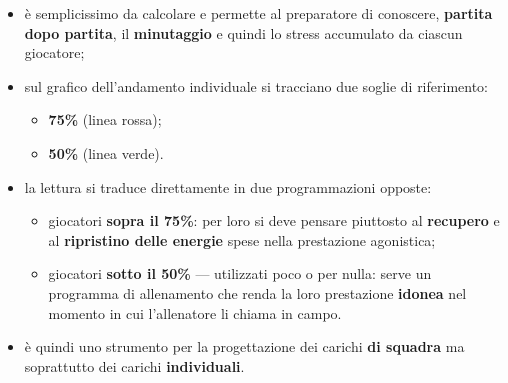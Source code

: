 \begin{itemize}
  \item è semplicissimo da calcolare e permette al preparatore di conoscere, \textbf{partita dopo
    partita}, il \textbf{minutaggio} e quindi lo stress accumulato da ciascun giocatore;
  \item sul grafico dell'andamento individuale si tracciano due soglie di riferimento:
    \begin{itemize}
      \item \textbf{75\%} (linea rossa);
      \item \textbf{50\%} (linea verde).
    \end{itemize}
  \item la lettura si traduce direttamente in due programmazioni opposte:
    \begin{itemize}
      \item giocatori \textbf{sopra il 75\%}: per loro si deve pensare piuttosto al
        \textbf{recupero} e al \textbf{ripristino delle energie} spese nella prestazione agonistica;
      \item giocatori \textbf{sotto il 50\%} --- utilizzati poco o per nulla: serve un programma di
        allenamento che renda la loro prestazione \textbf{idonea} nel momento in cui l'allenatore
        li chiama in campo.
    \end{itemize}
  \item è quindi uno strumento per la progettazione dei carichi \textbf{di squadra} ma soprattutto
    dei carichi \textbf{individuali}.
\end{itemize}
